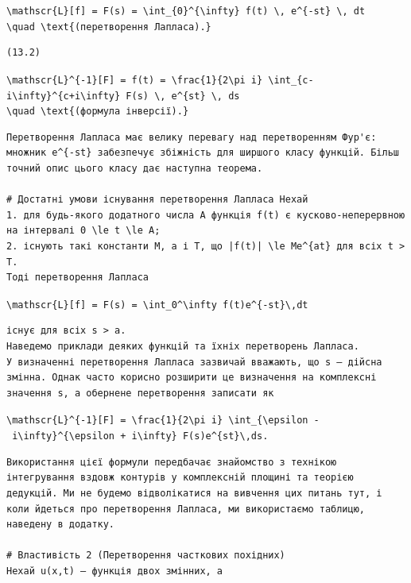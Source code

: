 \documentclass[
  ukrainian,
]{article}
\begin{document}
\texttt{\textbackslash{}mathscr\{L\}{[}f{]}\ =\ F(s)\ =\ \textbackslash{}int\_\{0\}\^{}\{\textbackslash{}infty\}\ f(t)\ \textbackslash{},\ e\^{}\{-st\}\ \textbackslash{},\ dt}
\texttt{\textbackslash{}quad\ \textbackslash{}text\{(перетворення\ Лапласа).\}}

\begin{verbatim}
(13.2)
\end{verbatim}

\texttt{\textbackslash{}mathscr\{L\}\^{}\{-1\}{[}F{]}\ =\ f(t)\ =\ \textbackslash{}frac\{1\}\{2\textbackslash{}pi\ i\}\ \textbackslash{}int\_\{c-i\textbackslash{}infty\}\^{}\{c+i\textbackslash{}infty\}\ F(s)\ \textbackslash{},\ e\^{}\{st\}\ \textbackslash{},\ ds}
\texttt{\textbackslash{}quad\ \textbackslash{}text\{(формула\ інверсії).\}}

\begin{verbatim}
Перетворення Лапласа має велику перевагу над перетворенням Фур'є: множник e^{-st} забезпечує збіжність для ширшого класу функцій. Більш точний опис цього класу дає наступна теорема.

# Достатні умови існування перетворення Лапласа Нехай
1. для будь-якого додатного числа A функція f(t) є кусково-неперервною на інтервалі 0 \le t \le A;
2. існують такі константи M, a і T, що |f(t)| \le Me^{at} для всіх t > T.
Тоді перетворення Лапласа
\end{verbatim}

\texttt{\textbackslash{}mathscr\{L\}{[}f{]}\ =\ F(s)\ =\ \textbackslash{}int\_0\^{}\textbackslash{}infty\ f(t)e\^{}\{-st\}\textbackslash{},dt}

\begin{verbatim}
існує для всіх s > a.
Наведемо приклади деяких функцій та їхніх перетворень Лапласа.
У визначенні перетворення Лапласа зазвичай вважають, що s — дійсна змінна. Однак часто корисно розширити це визначення на комплексні значення s, а обернене перетворення записати як
\end{verbatim}

\texttt{\textbackslash{}mathscr\{L\}\^{}\{-1\}{[}F{]}\ =\ \textbackslash{}frac\{1\}\{2\textbackslash{}pi\ i\}\ \textbackslash{}int\_\{\textbackslash{}epsilon\ -\ i\textbackslash{}infty\}\^{}\{\textbackslash{}epsilon\ +\ i\textbackslash{}infty\}\ F(s)e\^{}\{st\}\textbackslash{},ds.}

\begin{verbatim}
Використання цієї формули передбачає знайомство з технікою інтегрування вздовж контурів у комплексній площині та теорією дедукцій. Ми не будемо відволікатися на вивчення цих питань тут, і коли йдеться про перетворення Лапласа, ми використаємо таблицю, наведену в додатку.

# Властивість 2 (Перетворення часткових похідних)
Нехай u(x,t) — функція двох змінних, а
\end{verbatim}
\end{document}
